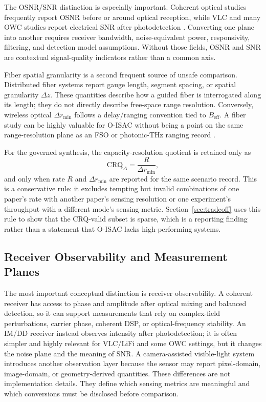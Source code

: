 \documentclass[letterpaper,journal]{IEEEtran}
\begin{document}
The OSNR/SNR distinction is especially important. Coherent optical studies frequently report OSNR before or around optical reception, while VLC and many OWC studies report electrical SNR after photodetection \cite{O_ISAC_028,O_ISAC_061,O_ISAC_100,O_ISAC_132}. Converting one plane into another requires receiver bandwidth, noise-equivalent power, responsivity, filtering, and detection model assumptions. Without those fields, OSNR and SNR are contextual signal-quality indicators rather than a common axis.

Fiber spatial granularity is a second frequent source of unsafe comparison. Distributed fiber systems report gauge length, segment spacing, or spatial granularity \(\Delta z\). These quantities describe how a guided fiber is interrogated along its length; they do not directly describe free-space range resolution. Conversely, wireless optical \(\Delta r_{\min}\) follows a delay/ranging convention tied to \(B_{\mathrm{eff}}\). A fiber study can be highly valuable for O-ISAC without being a point on the same range-resolution plane as an FSO or photonic-THz ranging record \cite{O_ISAC_006,O_ISAC_013,O_ISAC_046}.

For the governed synthesis, the capacity-resolution quotient is retained only as
\begin{equation}
    \mathrm{CRQ}_{\Delta}=\frac{R}{\Delta r_{\min}},
    \label{eq:crq_delta}
\end{equation}
and only when rate \(R\) and \(\Delta r_{\min}\) are reported for the same scenario record. This is a conservative rule: it excludes tempting but invalid combinations of one paper's rate with another paper's sensing resolution or one experiment's throughput with a different mode's sensing metric. Section~\ref{sec:tradeoff} uses this rule to show that the CRQ-valid subset is sparse, which is a reporting finding rather than a statement that O-ISAC lacks high-performing systems.

\subsection{Receiver Observability and Measurement Planes}

The most important conceptual distinction is receiver observability. A coherent receiver has access to phase and amplitude after optical mixing and balanced detection, so it can support measurements that rely on complex-field perturbations, carrier phase, coherent DSP, or optical-frequency stability. An IM/DD receiver instead observes intensity after photodetection; it is often simpler and highly relevant for VLC/LiFi and some OWC settings, but it changes the noise plane and the meaning of SNR. A camera-assisted visible-light system introduces another observation layer because the sensor may report pixel-domain, image-domain, or geometry-derived quantities. These differences are not implementation details. They define which sensing metrics are meaningful and which conversions must be disclosed before comparison.
\end{document}
